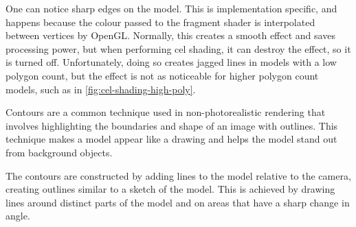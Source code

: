 One can notice sharp edges on the model. This is implementation specific, and happens because the 
colour passed to the fragment shader is interpolated between vertices by OpenGL. Normally, this creates 
a smooth effect and saves processing power, but when performing cel shading, it can destroy the effect, 
so it is turned off. Unfortunately, doing so creates jagged lines in models with a low polygon count, 
but the effect is  not as noticeable for higher polygon count models, such as in 
\autoref{fig:cel-shading-high-poly}. 

\newpage 


Contours are a common technique used in non-photorealistic rendering that involves highlighting 
the boundaries and shape of an image with outlines. This technique makes a model appear like a drawing 
and helps the model stand out from background objects.

The contours are constructed by adding lines to the model relative to the camera, creating outlines 
similar to a sketch of the model. This is achieved by drawing lines around distinct parts of the model 
and on areas that have a sharp change in angle.

